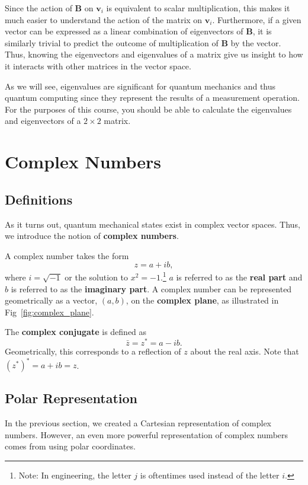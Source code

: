 \documentclass[11pt]{article} %
\begin{document}
Since the action of $\textbf{B}$ on $\textbf{v}_i$ is equivalent to scalar multiplication, this makes it much easier to understand the action of the matrix on $\textbf{v}_i$. Furthermore, if a given vector can be expressed as a linear combination of eigenvectors of $\textbf{B}$, it is similarly trivial to predict the outcome of multiplication of $\textbf{B}$ by the vector. Thus, knowing the eigenvectors and eigenvalues of a matrix give us insight to how it interacts with other matrices in the vector space. 

As we will see, eigenvalues are significant for quantum mechanics and thus quantum computing since they represent the results of a measurement operation. For the purposes of this course, you should be able to calculate the eigenvalues and eigenvectors of a $2 \times 2$ matrix.

\newpage
\section{Complex Numbers}



\subsection{Definitions}

As it turns out, quantum mechanical states exist in complex vector spaces. Thus, we introduce the notion of \textbf{complex numbers}. 

A complex number takes the form 
\begin{equation}
    z=a+ib,\nonumber
\end{equation} where $i=\sqrt{-1}$ or the solution to $x^2=-1$.\footnote{Note: In engineering, the letter $j$ is oftentimes used instead of the letter $i$.} $a$ is referred to as the \textbf{real part}  and $b$ is referred to as the \textbf{imaginary part}. A complex number can be represented geometrically as a vector, $(a,b)$, on the \textbf{complex plane}, as illustrated in Fig~\ref{fig:complex_plane}.


The \textbf{complex conjugate} is defined as 
\begin{equation}
    \bar{z}=z^*=a-ib.\nonumber
\end{equation} 
Geometrically, this corresponds to a reflection of $z$ about the real axis. Note that $(z^*)^*=a+ib=z$.

\subsection{Polar Representation}
In the previous section, we created a Cartesian representation of complex numbers. However, an even more powerful representation of complex numbers comes from using polar coordinates. 
\end{document}
